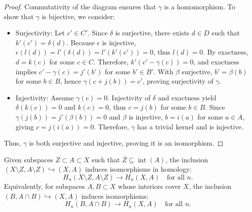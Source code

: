 \begin{proof}
	Commutativity of the diagram ensures that $\gamma$ is a homomorphism. To show
	that $\gamma$ is bijective, we consider:

	\begin{itemize}
		\item Surjectivity: Let $c' \in C'$. Since $\delta$ is surjective, there
			exists $d \in D$ such that $k'(c') = \delta(d)$. Because $\epsilon$ is injective,
			$\epsilon(l(d)) = l'(\delta(d)) = l'(k'(c')) = 0$, thus $l(d) = 0$. By
			exactness, $d = k(c)$ for some $c \in C$. Therefore, $k'(c' - \gamma(c)) =
			0$, and exactness implies $c' - \gamma(c) = j'(b')$ for some $b' \in B'$. With
			$\beta$ surjective, $b' = \beta(b)$ for some $b \in B$, hence $\gamma(c + j
			(b)) = c'$, proving surjectivity of $\gamma$.

		\item Injectivity: Assume $\gamma(c) = 0$. Injectivity of $\delta$ and exactness
			yield $\delta(k(c)) = 0$ and $k(c) = 0$, thus $c = j(b)$ for some
			$b \in B$. Since $\gamma(j(b)) = j'(\beta(b)) = 0$ and $\beta$ is injective,
			$b = i(a)$ for some $a \in A$, giving $c = j(i(a)) = 0$. Therefore, $\gamma$
			has a trivial kernel and is injective.
	\end{itemize}

	Thus, $\gamma$ is both surjective and injective, proving it is an isomorphism.
\end{proof}

\begin{theorem}
	{\cite[\S 2.20]{hatcher2005algebraic} \label{excisiontheorem} Given subspaces $Z \subset A \subset X$ such that $\overline{Z}\subseteq \operatorname{int}(A)$, the inclusion $(X\setminus Z, A\setminus Z) \hookrightarrow (X, A)$ induces isomorphisms in homology}:
	\[
		H_{n}(X\setminus Z, A\setminus Z) \to H_{n}(X, A) \quad \text{for all }n.
	\]
	Equivalently, for subspaces $A, B \subset X$ whose interiors cover $X$, the
	inclusion $(B, A \cap B) \hookrightarrow (X, A)$ induces isomorphisms:
	\[
		H_{n}(B, A \cap B) \to H_{n}(X, A) \quad \text{for all }n.
	\]
\end{theorem}

